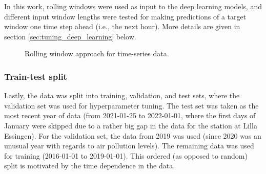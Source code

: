 In this work, rolling windows were used as input to the deep learning models, and different input window lengths were tested for making predictions of a target window one time step ahead (i.e., the next hour). More details are given in section \ref{sec:tuning_deep_learning} below.
 \begin{figure}[h]
\begin{center}
\caption{Rolling window approach for time-series data.}
\label{fig:sliding-window}
\end{center}
\end{figure}
\subsubsection{Train-test split} 
Lastly, the data was split into training, validation, and test sets, where the validation set was used for hyperparameter tuning. The test set was taken as the most recent year of data (from 2021-01-25 to 2022-01-01, where the first days of January were skipped due to a rather big gap in the data for the station at Lilla Essingen). For the validation set, the data from 2019 was used (since 2020 was an unusual year with regards to air pollution levels). The remaining data was used for training (2016-01-01 to 2019-01-01). This ordered (as opposed to random) split is motivated by the time dependence in the data.

